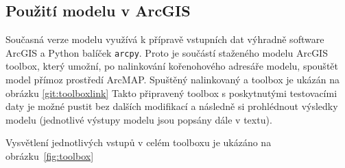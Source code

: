 % 
% 
  
\subsection{Použití modelu v ArcGIS}
  
Současná verze modelu \smod využívá k přípravě vstupních dat výhradně software ArcGIS a Python balíček {\tt arcpy}. 
Proto je součástí staženého modelu ArcGIS toolbox, který umožní, po nalinkování kořenohového adresáře modelu, 
spouštět model \smod přímoz prostředí ArcMAP. Spuštěný nalinkovaný a toolbox je ukázán na obrázku \ref{git:toolboxlink}
Takto připravený toolbox s poskytnutými testovacími daty je možné pustit bez dalších modifikací a následně si prohlédnout 
výsledky modelu (jednotlivé výstupy modelu jsou popsány dále v textu). 

Vysvětlení jednotlivých vstupů v celém toolboxu je ukázáno na obrázku~\ref{fig:toolbox}

%   
  
